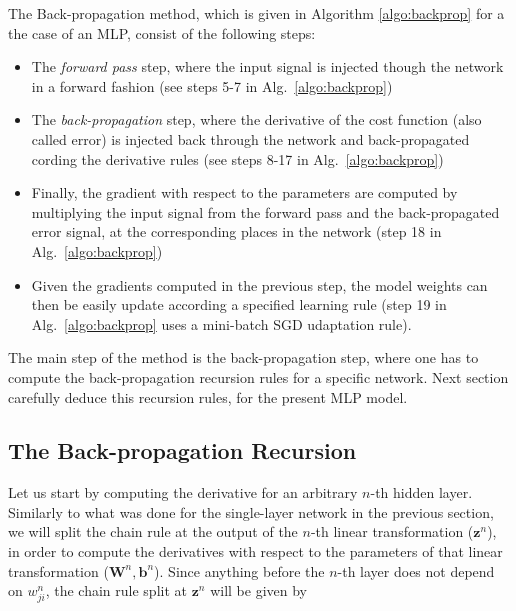 The Back-propagation method, which is given in Algorithm \ref{algo:backprop} for a the case of an MLP, consist of the following steps:
\begin{itemize}
\item The \textit{forward pass} step, where the input signal is injected though the network  in a forward fashion (see steps 5-7 in Alg.~\ref{algo:backprop})
\item The \textit{back-propagation} step, where the derivative of the cost function (also called error) is injected back through the network and back-propagated cording the derivative rules (see steps 8-17 in Alg.~\ref{algo:backprop})
\item Finally, the gradient with respect to the parameters are computed by multiplying the input signal from the forward pass and the back-propagated error signal, at the corresponding places in the network (step 18 in Alg.~\ref{algo:backprop})
\item Given the gradients computed in the previous step, the model weights can then be easily update according a specified learning rule (step 19 in Alg.~\ref{algo:backprop} uses a mini-batch SGD udaptation rule).
\end{itemize}
The main step of the method is the back-propagation step, where one has to compute the back-propagation recursion rules for a specific network.
Next section carefully deduce this recursion rules, for the present MLP model. 


%

\subsection{The Back-propagation Recursion}
Let us start by computing the derivative for an arbitrary $n$-th hidden layer. Similarly to what was done for the single-layer network in the previous section, we will
split the chain rule at the output of the $n$-th linear transformation ($\mathbf{z}^n$), in order to compute the derivatives with respect to the parameters of that linear transformation ($\mathbf{W}^n, \mathbf{b}^n$). Since anything before the $n$-th layer does not depend on $w_{ji}^n$, the chain rule split at $\mathbf{z}^n$ will be given by

